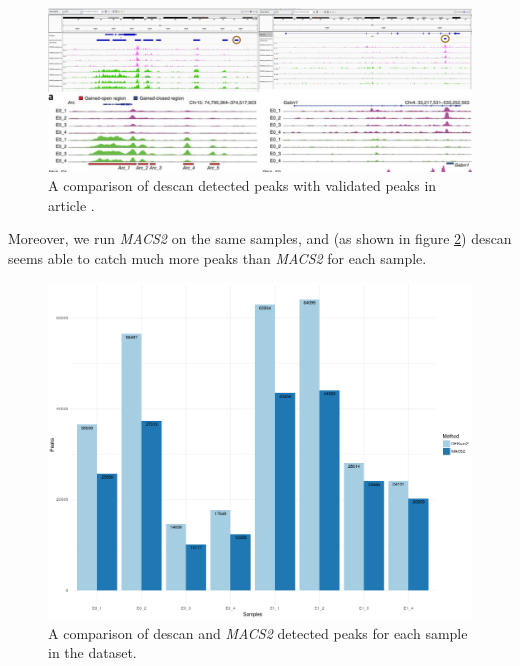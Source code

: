 \begin{figure}[H]
\includegraphics[width=\textwidth,height=\textheight,keepaspectratio]{img/descan2/peaks.png}
\caption[\gls{descan} peaks detection]{A comparison of \gls{descan} detected peaks with validated peaks in article \cite{Su2017}.}
\label{fig:peaksdescan}
\centering
\end{figure}

Moreover, we run \textit{MACS2} on the same samples, and (as shown in figure \ref{fig:des2m2peaks}) \gls{descan} seems able to catch much more peaks than \textit{MACS2} for each sample.

\begin{figure}[H]
\includegraphics[width=\textwidth,height=\textheight,keepaspectratio]{img/descan2/d2m2_peaks_number.png}
\caption[\gls{descan} and  peaks detection]{A comparison of \gls{descan} and \textit{MACS2} detected peaks for each sample in the dataset.}
\label{fig:des2m2peaks}
\centering
\end{figure}

